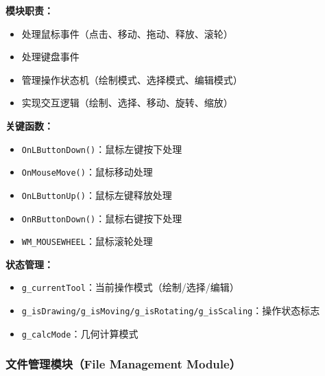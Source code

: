 \documentclass[12pt,a4paper]{article}
\begin{document}
\begin{tcolorbox}
\textbf{模块职责：}
\begin{itemize}
    \item 处理鼠标事件（点击、移动、拖动、释放、滚轮）
    \item 处理键盘事件
    \item 管理操作状态机（绘制模式、选择模式、编辑模式）
    \item 实现交互逻辑（绘制、选择、移动、旋转、缩放）
\end{itemize}

\textbf{关键函数：}
\begin{itemize}
    \item \texttt{OnLButtonDown()}：鼠标左键按下处理
    \item \texttt{OnMouseMove()}：鼠标移动处理
    \item \texttt{OnLButtonUp()}：鼠标左键释放处理
    \item \texttt{OnRButtonDown()}：鼠标右键按下处理
    \item \texttt{WM\_MOUSEWHEEL}：鼠标滚轮处理
\end{itemize}

\textbf{状态管理：}
\begin{itemize}
    \item \texttt{g\_currentTool}：当前操作模式（绘制/选择/编辑）
    \item \texttt{g\_isDrawing/g\_isMoving/g\_isRotating/g\_isScaling}：操作状态标志
    \item \texttt{g\_calcMode}：几何计算模式
\end{itemize}
\end{tcolorbox}

\subsubsection{文件管理模块（File Management Module）}
\end{document}
